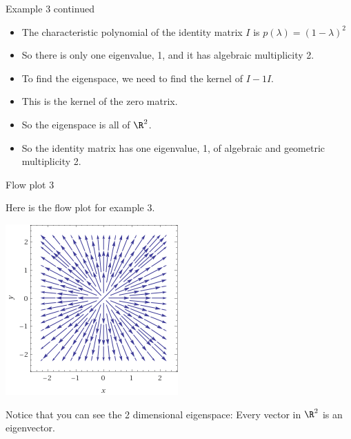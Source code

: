 \documentclass{beamer}
\begin{document}
\begin{frame}{Example 3 continued}

\begin{itemize}
\item The characteristic polynomial of the identity matrix $I$ is
$p(\lambda) = (1-\lambda)^2$
\item So there is only one eigenvalue, 1, and it has algebraic multiplicity 2.
\item To find the eigenspace, we need to find the kernel of $I - 1 I$.
\item This is the kernel of the zero matrix.
\item So the eigenspace is all of $\R^2$.
\item So the identity matrix has one eigenvalue, 1, of algebraic and
geometric multiplicity 2.
\end{itemize}
\end{frame}

\begin{frame}{Flow plot 3}


Here is the flow plot for example 3.

\pause

\begin{center}
\includegraphics[scale=0.45]{stream3}
\end{center}

\pause

Notice that you can see the 2 dimensional eigenspace: Every vector in $\R^2$ is an eigenvector.

\end{frame}
\end{document}

